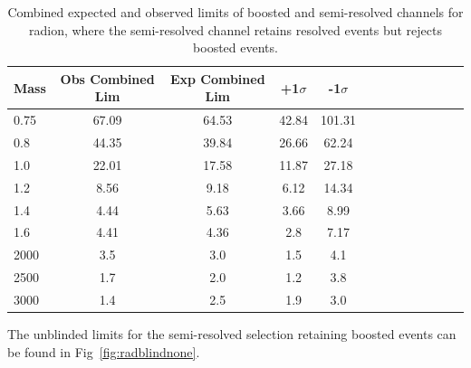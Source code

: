 \begin{table}[h]
\begin{center}
\begin{tabular}{|l|c|c|c|c|c|c|c|c|c|c|c|c|}
\hline
Mass &Obs Combined Lim & Exp Combined Lim & +1$\sigma$ & -1$\sigma$\\ \hline
0.75 & 67.09 & 64.53 & 42.84 & 101.31\\
0.8 & 44.35 & 39.84 & 26.66 & 62.24\\
1.0 & 22.01 & 17.58 & 11.87 & 27.18\\
1.2 & 8.56 & 9.18 & 6.12 & 14.34\\
1.4 & 4.44 & 5.63 & 3.66 & 8.99\\
1.6 & 4.41 & 4.36 & 2.8 & 7.17\\
2000 & 3.5 & 3.0 & 1.5 & 4.1\\
2500 & 1.7 & 2.0 & 1.2 & 3.8\\
3000 & 1.4 & 2.5 & 1.9 & 3.0\\
\hline
\end{tabular}
\end{center}
\caption{Combined expected and observed limits of boosted and semi-resolved channels for radion, where the semi-resolved channel retains resolved events but rejects boosted events.}
\label{tab:1p12p1Rad}
\end{table}

%
The unblinded limits for the semi-resolved selection retaining boosted events can be found in Fig~\ref{fig:radblindnone}.

